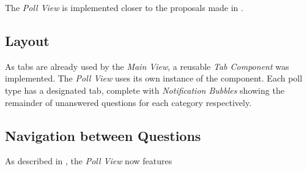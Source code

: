 The \emph{Poll View} is implemented closer to the proposals made in .	

\subsection{Layout}

As tabs are already used by the \emph{Main View}, a reusable \emph{Tab Component} was implemented. The \emph{Poll View} uses its own instance of the component. Each poll type has a designated tab, complete with \emph{Notification Bubbles} showing the remainder of unanswered questions for each category respectively.

\subsection{Navigation between Questions}

As described in , the \emph{Poll View} now features